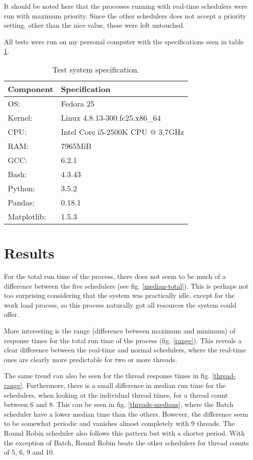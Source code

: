 \documentclass[12pt, a4paper]{article} %
\begin{document}
It should be noted here that the processes running with real-time schedulers were run with maximum priority.
Since the other schedulers does not accept a priority setting, other than the nice value, these were left untouched.

All tests were run on my personal computer with the specifications seen in table \ref{spec}.

\begin{table}[h]
	\centering
	\begin{tabular}{ll}
		Component & Specification \\
		\hline
		OS: & Fedora 25 \\
		Kernel: & Linux 4.8.13-300.fc25.x86\_64 \\
		CPU: & Intel Core i5-2500K CPU @ 3.7GHz \\
		RAM: & 7965MiB \\
		GCC: & 6.2.1 \\
		Bash: & 4.3.43 \\
		Python: & 3.5.2 \\
		Pandas: & 0.18.1 \\
		Matplotlib: & 1.5.3
	\end{tabular}
	\caption{Test system specification.}
	\label{spec}
\end{table}



\section{Results}

For the total run time of the process, there does not seem to be much of a difference between the five schedulers (see fig. \ref{median-total}).
This is perhaps not too surprising considering that the system was practically idle, except for the work load process, so this process naturally got all resources the system could offer.



More interesting is the range (difference between maximum and minimum) of response times for the total run time of the process (fig. \ref{range}).
This reveals a clear difference between the real-time and normal schedulers, where the real-time ones are clearly more predictable for two or more threads.



The same trend can also be seen for the thread response times in fig. \ref{thread-range}.
Furthermore, there is a small difference in median run time for the schedulers, when looking at the individual thread times, for a thread count between 6 and 8.
This can be seen in fig. \ref{threads-medians}, where the Batch scheduler have a lower median time than the others.
However, the difference seem to be somewhat periodic and vanishes almost completely with 9 threads.
The Round Robin scheduler also follows this pattern but with a shorter period.
With the exception of Batch, Round Robin beats the other schedulers for thread counts of 5, 6, 9 and 10.
\end{document}
